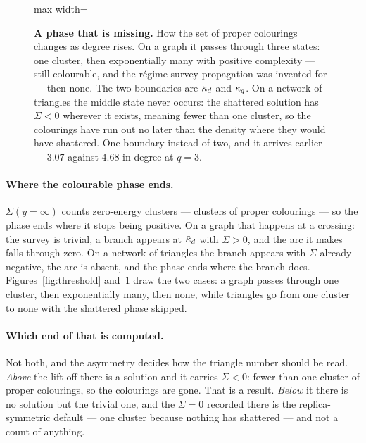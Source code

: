\begin{figure}[t]
\begin{adjustbox}{max width=\linewidth}
\end{adjustbox}
\caption{\textbf{A phase that is missing.} How the set of proper colourings
changes as degree rises. On a graph it passes through three states: one cluster,
then exponentially many with positive complexity --- still colourable, and the
r\'egime survey propagation was invented for --- then none. The two boundaries
are $\bar\kappa_{d}$ and $\bar\kappa_{q}$. On a network of triangles the middle state never
occurs: the shattered solution has $\Sigma<0$ wherever it exists, meaning fewer
than one cluster, so the colourings have run out no later than the density where
they would have shattered. One boundary instead of two, and it arrives earlier
--- $3.07$ against $4.68$ in degree at $q=3$.}
\label{fig:phases}
\end{figure}

\paragraph{Where the colourable phase ends.} $\Sigma(y=\infty)$ counts
zero-energy clusters --- clusters of proper colourings --- so the phase ends
where it stops being positive. On a graph that happens at a crossing: the survey
is trivial, a branch appears at $\bar\kappa_{d}$ with $\Sigma>0$, and the arc it makes
falls through zero. On a network of triangles the branch appears with $\Sigma$
already negative, the arc is absent, and the phase ends where the branch does.
Figures~\ref{fig:threshold} and~\ref{fig:phases} draw the two cases: a graph
passes through one cluster, then exponentially many, then none, while triangles
go from one cluster to none with the shattered phase skipped.

\paragraph{Which end of that is computed.} Not both, and the asymmetry decides
how the triangle number should be read. \emph{Above} the lift-off there is a
solution and it carries $\Sigma<0$: fewer than one cluster of proper colourings,
so the colourings are gone. That is a result. \emph{Below} it there is no
solution but the trivial one, and the $\Sigma=0$ recorded there is the
replica-symmetric default --- one cluster because nothing has shattered --- and
not a count of anything.

